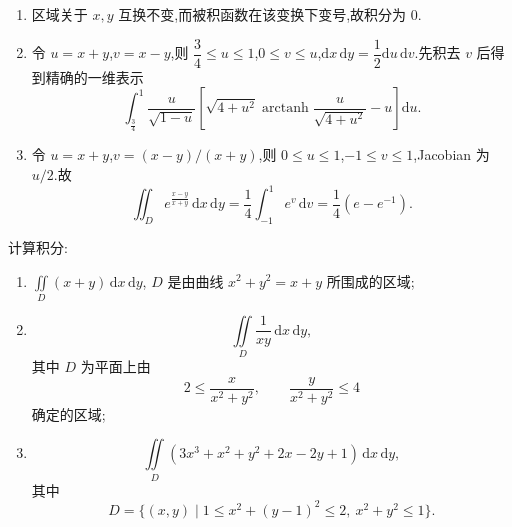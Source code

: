 \begin{solution}
    \leavevmode
    \begin{enumerate}
        \item 区域关于 $x,y$ 互换不变,而被积函数在该变换下变号,故积分为 $0$.
        \item 令 $u=x+y$,$v=x-y$,则 $\dfrac{3}{4}\leq u\leq1$,$0\leq v\leq u$,$\mathrm{d}x\,\mathrm{d}y=\dfrac{1}{2}\mathrm{d}u\,\mathrm{d}v$.先积去 $v$ 后得到精确的一维表示
              \[
                  \displaystyle\int_{\frac{3}{4}}^{1}\dfrac{u}{\sqrt{1-u}}
                  \left[\sqrt{4+u^2}\operatorname{arctanh}\dfrac{u}{\sqrt{4+u^2}}-u\right]\mathrm{d}u.
              \]
        \item 令 $u=x+y$,$v=(x-y)/(x+y)$,则 $0\leq u\leq1$,$-1\leq v\leq1$,Jacobian 为 $u/2$.故
              \[
                  \displaystyle\iint_D e^{\frac{x-y}{x+y}}\,\mathrm{d}x\,\mathrm{d}y
                  =\dfrac{1}{4}\int_{-1}^1e^v\,\mathrm{d}v
                  =\dfrac{1}{4}\left(e-e^{-1}\right).
              \]
    \end{enumerate}
\end{solution}

\begin{example}
    计算积分:
    \begin{enumerate}
        \item $\displaystyle\iint\limits_D(x+y)\,\mathrm{d}x\,\mathrm{d}y$, $D$ 是由曲线 $x^2+y^2=x+y$ 所围成的区域;
        \item
              \[
                  \displaystyle\iint\limits_D\dfrac{1}{xy}\,\mathrm{d}x\,\mathrm{d}y,
              \]
              其中 $D$ 为平面上由
              \[
                  2\leq\dfrac{x}{x^2+y^2},\qquad
                  \dfrac{y}{x^2+y^2}\leq4
              \]
              确定的区域;
        \item
              \[
                  \displaystyle\iint\limits_D\left(3x^3+x^2+y^2+2x-2y+1\right)\,\mathrm{d}x\,\mathrm{d}y,
              \]
              其中
              \[
                  D=\{(x,y)\mid1\leq x^2+(y-1)^2\leq2,\ x^2+y^2\leq1\}.
              \]
    \end{enumerate}
\end{example}
\exampleblank

